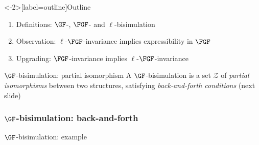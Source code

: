 \documentclass[aspectratio=169]{beamer}
\begin{document}
\begin{frame}<-2>[label=outline]{Outline}%
  \begin{enumerate}
    \item<alert@2| check@3-> Definitions: $\GF$-, $\FGF$- and $\ell$-bisimulation
    \item<check@3-> Observation: $\ell$-$\FGF$-invariance implies expressibility in $\FGF$
    \item<alert@4>
          Upgrading: $\FGF$-invariance implies $\ell$-$\FGF$-invariance
  \end{enumerate}

\end{frame}

\begin{frame}{$\GF$-bisimulation: partial isomorphism}
  A $\GF$-bisimulation is a set $\mathcal{Z}$ of \emph{partial isomorphisms} between two structures, satisfying \emph{back-and-forth conditions} (next slide)
  \vfill
  \begin{center}
  
  \end{center}
\end{frame}

\begin{frame}
  \frametitle{$\GF$-bisimulation: back-and-forth}
  \begin{center}
    
    \pause\vfill
  \end{center}
\end{frame}

\begin{frame}{$\GF$-bisimulation: example}
\end{frame}
\end{document}
